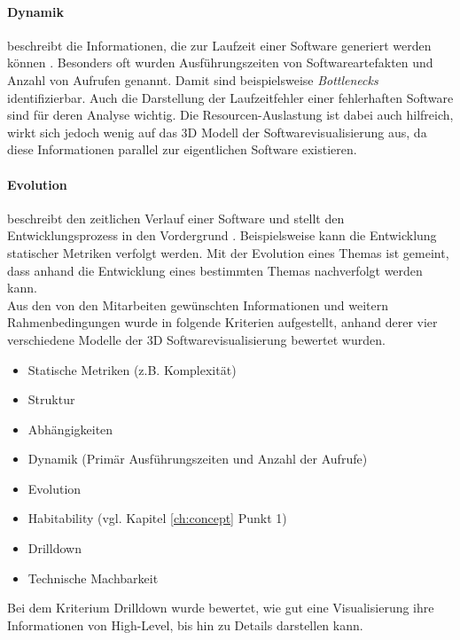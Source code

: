 \paragraph{Dynamik} beschreibt die Informationen, die zur Laufzeit einer Software generiert werden können \cite{diehl2007software}. Besonders oft wurden Ausführungszeiten von Softwareartefakten und Anzahl von Aufrufen genannt. Damit sind beispielsweise \emph{Bottlenecks} identifizierbar. Auch die Darstellung der Laufzeitfehler einer fehlerhaften Software sind für deren Analyse wichtig. Die Resourcen-Auslastung ist dabei auch hilfreich, wirkt sich jedoch wenig auf das 3D Modell der Softwarevisualisierung aus, da diese Informationen parallel zur eigentlichen Software existieren.

\paragraph{Evolution} beschreibt den zeitlichen Verlauf einer Software und stellt den Entwicklungsprozess in den Vordergrund \cite{diehl2007software}. Beispielsweise kann die Entwicklung statischer Metriken verfolgt werden. Mit der Evolution eines Themas ist gemeint, dass anhand die Entwicklung eines bestimmten Themas nachverfolgt werden kann.\\

Aus den von den Mitarbeiten gewünschten Informationen und weitern Rahmenbedingungen wurde in \cite{puetz2017softwarevisualisierung} folgende Kriterien aufgestellt, anhand derer vier verschiedene Modelle der 3D Softwarevisualisierung bewertet wurden.

\begin{itemize}
  \itemsep0pt
  \item Statische Metriken (z.B. Komplexität)
  \item Struktur
  \item Abhängigkeiten
  \item Dynamik (Primär Ausführungszeiten und Anzahl der Aufrufe)
  \item Evolution
  \item Habitability (vgl. Kapitel \ref{ch:concept} Punkt 1)
  \item Drilldown
  \item Technische Machbarkeit
\end{itemize}

Bei dem Kriterium Drilldown wurde bewertet, wie gut eine Visualisierung ihre Informationen von High-Level, bis hin zu Details darstellen kann.


